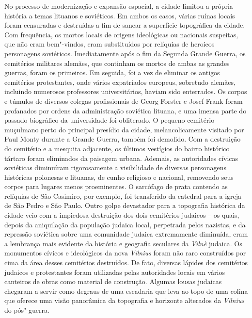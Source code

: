 No processo de modernização e expansão espacial, a cidade
limitou a própria história a temas lituanos e soviéticos. Em ambos os
casos, várias ruínas locais foram censuradas e destruídas a fim de
sanear a superfície topográfica da cidade. Com frequência, os mortos
locais de origens ideológicas ou nacionais suspeitas, que não eram
bem"-vindos, eram substituídos por relíquias de heroicos personagens
soviéticos. Imediatamente após o fim da Segunda Grande Guerra, os
cemitérios militares alemães, que continham os mortos de ambas as
grandes guerras, foram os primeiros. Em seguida, foi a vez de eliminar
os antigos cemitérios protestantes, onde vários expatriados europeus, sobretudo alemães, incluindo numerosos professores universitários,
haviam sido enterrados. Os corpos e túmulos de diversos colegas
profissionais de Georg Forster e Josef Frank foram profanados por ordens
da administração soviética lituana, e uma imensa parte do passado
biográfico da universidade foi obliterado. O pequeno cemitério muçulmano
perto do principal presídio da cidade, melancolicamente visitado por
Paul Monty durante a Grande Guerra, também foi demolido. Com a
destruição do cemitério e a mesquita adjacente, os últimos vestígios do
bairro histórico tártaro foram eliminados da paisagem urbana. Ademais,
as autoridades cívicas soviéticas diminuíram rigorosamente a
visibilidade de diversas personagens históricas polonesas e lituanas, de
cunho religioso e nacional, removendo seus corpos para lugares menos
proeminentes. O sarcófago de prata contendo as relíquias de São
Casimiro, por exemplo, foi transferido da catedral para a igreja de São
Pedro e São Paulo. Outro golpe devastador para a topografia histórica da
cidade veio com a impiedosa destruição dos dois cemitérios judaicos -- os
quais, depois da aniquilação da população judaica local, perpetrada
pelos nazistas, e da repressão soviética sobre uma comunidade judaica
extremamente diminuída, eram a lembrança mais evidente da história e
geografia seculares da \textit{Vilnè} judaica. Os monumentos cívicos e
ideológicos da nova \textit{Vilnius} foram não raro construídos por cima da área
desses cemitérios destruídos. De fato, diversas lápides dos cemitérios
judaicos e protestantes foram utilizadas pelas autoridades locais em
vários canteiros de obras como material de construção. Algumas lousas
judaicas chegaram a servir como degraus de uma escadaria que leva ao
topo de uma colina que oferece uma visão panorâmica da topografia e
horizonte alterados da \textit{Vilnius} do pós"-guerra.

